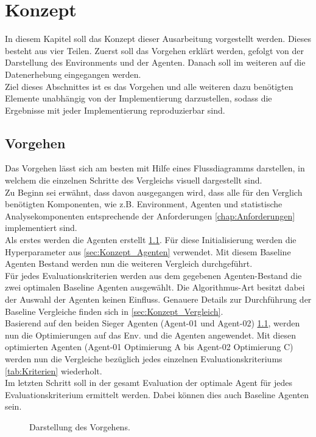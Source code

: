 \chapter{Konzept}
In diesem Kapitel soll das Konzept dieser Ausarbeitung vorgestellt werden. Dieses besteht aus vier Teilen. Zuerst soll das Vorgehen erklärt werden, gefolgt von der Darstellung des Environments und der Agenten. Danach soll im weiteren auf die Datenerhebung eingegangen werden.\\
Ziel dieses Abschnittes ist es das Vorgehen und alle weiteren dazu benötigten Elemente unabhängig von der Implementierung darzustellen, sodass die Ergebnisse mit jeder Implementierung reproduzierbar sind.

\section{Vorgehen} \label{sec:Konzept_Vorgehen}
Das Vorgehen lässt sich am besten mit Hilfe eines Flussdiagramms darstellen, in welchem die einzelnen Schritte des Vergleichs visuell dargestellt sind.\\
Zu Beginn sei erwähnt, dass davon ausgegangen wird, dass alle für den Verglich benötigten Komponenten, wie z.B. Environment, Agenten und statistische Analysekomponenten entsprechende der Anforderungen \ref{chap:Anforderungen} implementiert sind.\\
Als erstes werden die Agenten erstellt \ref{fig:Vorgehen}. Für diese Initialisierung werden die Hyperparameter aus \ref{sec:Konzept_Agenten} verwendet.
Mit diesem Baseline Agenten Bestand werden nun die weiteren Vergleich durchgeführt.\\
Für jedes Evaluationskriterien werden aus dem gegebenen Agenten-Bestand die zwei optimalen Baseline Agenten ausgewählt. Die Algorithmus-Art besitzt dabei der Auswahl der Agenten keinen Einfluss. Genauere Details zur Durchführung der Baseline Vergleiche finden sich in \ref{sec:Konzept_Vergleich}.\\
Basierend auf den beiden Sieger Agenten (Agent-01 und Agent-02) \ref{fig:Vorgehen}, werden nun die Optimierungen auf das Env. und die Agenten angewendet. Mit diesen optimierten Agenten (Agent-01 Optimierung A bis Agent-02 Optimierung C) werden nun die Vergleiche bezüglich jedes einzelnen Evaluationskriteriums \ref{tab:Kriterien} wiederholt.\\
Im letzten Schritt soll in der gesamt Evaluation der optimale Agent für jedes Evaluationskriterium ermittelt werden. Dabei können dies auch Baseline Agenten sein.
\begin{figure}[H]
	\centering
	\def\svgscale{0.095}
	
	\caption[Flussdiagramm des Vorgehens]{Darstellung des Vorgehens.}
	\label{fig:Vorgehen}
\end{figure}

